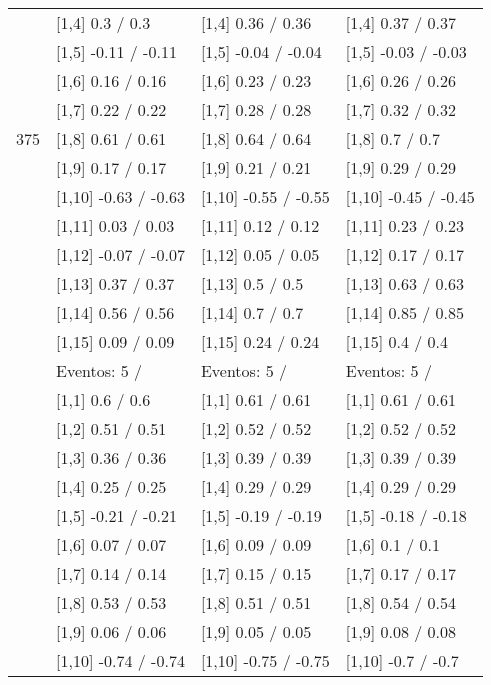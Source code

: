 \begin{table}
\begin{tabular}[t]{llll}
\addlinespace
 & {}[1,4] 0.3  / 0.3 & {}[1,4] 0.36  / 0.36 & {}[1,4] 0.37  / 0.37\\
 & {}[1,5] -0.11  / -0.11 & {}[1,5] -0.04  / -0.04 & {}[1,5] -0.03  / -0.03\\
 & {}[1,6] 0.16  / 0.16 & {}[1,6] 0.23  / 0.23 & {}[1,6] 0.26  / 0.26\\
 & {}[1,7] 0.22  / 0.22 & {}[1,7] 0.28  / 0.28 & {}[1,7] 0.32  / 0.32\\
375 & {}[1,8] 0.61  / 0.61 & {}[1,8] 0.64  / 0.64 & {}[1,8] 0.7  / 0.7\\
\addlinespace
 & {}[1,9] 0.17  / 0.17 & {}[1,9] 0.21  / 0.21 & {}[1,9] 0.29  / 0.29\\
 & {}[1,10] -0.63  / -0.63 & {}[1,10] -0.55  / -0.55 & {}[1,10] -0.45  / -0.45\\
 & {}[1,11] 0.03  / 0.03 & {}[1,11] 0.12  / 0.12 & {}[1,11] 0.23  / 0.23\\
 & {}[1,12] -0.07  / -0.07 & {}[1,12] 0.05  / 0.05 & {}[1,12] 0.17  / 0.17\\
 & {}[1,13] 0.37  / 0.37 & {}[1,13] 0.5  / 0.5 & {}[1,13] 0.63  / 0.63\\
\addlinespace
 & {}[1,14] 0.56  / 0.56 & {}[1,14] 0.7  / 0.7 & {}[1,14] 0.85  / 0.85\\
 & {}[1,15] 0.09  / 0.09 & {}[1,15] 0.24  / 0.24 & {}[1,15] 0.4  / 0.4\\
 & Eventos:  5 / & Eventos:  5 / & Eventos:  5 /\\
 & {}[1,1] 0.6  / 0.6 & {}[1,1] 0.61  / 0.61 & {}[1,1] 0.61  / 0.61\\
 & {}[1,2] 0.51  / 0.51 & {}[1,2] 0.52  / 0.52 & {}[1,2] 0.52  / 0.52\\
\addlinespace
 & {}[1,3] 0.36  / 0.36 & {}[1,3] 0.39  / 0.39 & {}[1,3] 0.39  / 0.39\\
 & {}[1,4] 0.25  / 0.25 & {}[1,4] 0.29  / 0.29 & {}[1,4] 0.29  / 0.29\\
 & {}[1,5] -0.21  / -0.21 & {}[1,5] -0.19  / -0.19 & {}[1,5] -0.18  / -0.18\\
 & {}[1,6] 0.07  / 0.07 & {}[1,6] 0.09  / 0.09 & {}[1,6] 0.1  / 0.1\\
 & {}[1,7] 0.14  / 0.14 & {}[1,7] 0.15  / 0.15 & {}[1,7] 0.17  / 0.17\\
\addlinespace
500 & {}[1,8] 0.53  / 0.53 & {}[1,8] 0.51  / 0.51 & {}[1,8] 0.54  / 0.54\\
 & {}[1,9] 0.06  / 0.06 & {}[1,9] 0.05  / 0.05 & {}[1,9] 0.08  / 0.08\\
 & {}[1,10] -0.74  / -0.74 & {}[1,10] -0.75  / -0.75 & {}[1,10] -0.7  / -0.7\\

\end{tabular}
\end{table}
